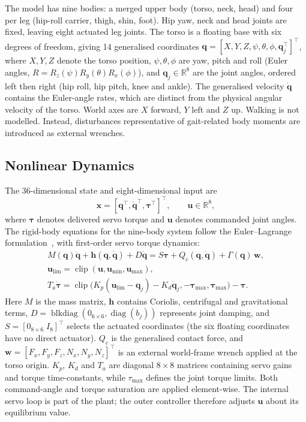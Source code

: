 \documentclass[conference,a4paper]{IEEEtran}
\begin{document}
The model has nine bodies: a merged upper body (torso, neck, head) and four per leg (hip-roll carrier, thigh, shin, foot). Hip yaw, neck and head joints are fixed, leaving eight actuated leg joints. The torso is a floating base with six degrees of freedom, giving 14 generalised coordinates $\mathbf{q}=[X,Y,Z,\psi,\theta,\phi,\mathbf{q}_j^\top]^\top$, where $X,Y,Z$ denote the torso position, $\psi,\theta,\phi$ are yaw, pitch and roll (Euler angles, $R=R_z(\psi)R_y(\theta)R_x(\phi)$), and $\mathbf{q}_j\in\mathbb{R}^8$ are the joint angles, ordered left then right (hip roll, hip pitch, knee and ankle). The generalised velocity $\dot{\mathbf{q}}$ contains the Euler-angle rates, which are distinct from the physical angular velocity of the torso. World axes are $X$ forward, $Y$ left and $Z$ up. Walking is not modelled. Instead, disturbances representative
of gait-related body moments are introduced as external wrenches.


\subsection{Nonlinear Dynamics}
The 36-dimensional state and eight-dimensional input are
\[
\mathbf{x}=[\mathbf{q}^\top,\dot{\mathbf{q}}^\top,
\boldsymbol{\tau}^\top]^\top,\qquad
\mathbf{u}\in\mathbb{R}^8,
\]
where $\boldsymbol{\tau}$ denotes delivered servo torque and $\mathbf{u}$ denotes commanded joint angles. The rigid-body equations for the nine-body system follow the Euler--Lagrange formulation~\cite{tedrake_multibody}, with first-order servo torque dynamics:
\begin{equation*}
\label{eq:servo}
\begin{gathered}
M(\mathbf{q})\ddot{\mathbf{q}}
+ \mathbf{h}(\mathbf{q},\dot{\mathbf{q}})
+ D\dot{\mathbf{q}}
= S\boldsymbol{\tau} + Q_c(\mathbf{q},\dot{\mathbf{q}})
+ \Gamma(\mathbf{q})\,\mathbf{w}, \\
\mathbf{u}_{\mathrm{lim}}
=
\operatorname{clip}
(\mathbf{u},\mathbf{u}_{\min},\mathbf{u}_{\max}),\\
T_a\dot{\boldsymbol{\tau}}
=
\operatorname{clip}\big(
K_p(\mathbf{u}_{\mathrm{lim}}-\mathbf{q}_j)
-K_d\dot{\mathbf{q}}_j,
-\boldsymbol{\tau}_{\max},
\boldsymbol{\tau}_{\max}
\big)
-\boldsymbol{\tau}.
\end{gathered}
\end{equation*}
Here $M$ is the mass matrix, $\mathbf{h}$ contains Coriolis, centrifugal and gravitational terms, $D=\operatorname{blkdiag}(0_{6\times6},\operatorname{diag}(b_j))$ represents joint damping, and $S=[0_{8\times6}\;I_8]^\top$ selects the actuated coordinates (the six floating coordinates have no direct actuator). $Q_c$ is the generalised contact force, and $\mathbf{w}=[F_x,F_y,F_z,N_x,N_y,N_z]^\top$ is an external world-frame wrench applied at the torso origin. $K_p$, $K_d$ and $T_a$ are diagonal $8 \times8$ matrices containing servo gains and torque time-constants, while $\tau_{\text{max}}$ defines the joint torque limits. Both command-angle and torque saturation are applied element-wise. The internal servo loop is part of the plant; the outer controller therefore adjusts $\mathbf{u}$ about its equilibrium value.
\end{document}
